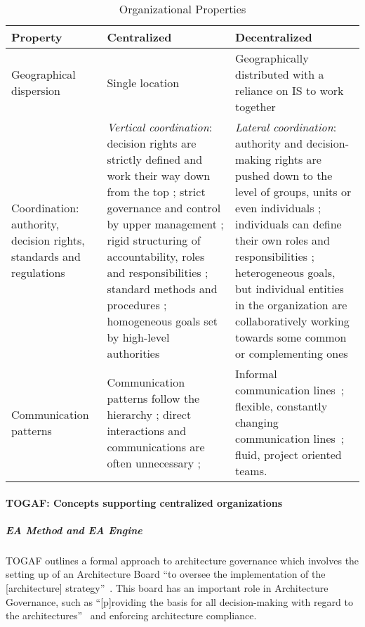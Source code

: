 \begin{table}
\caption{Organizational Properties}
\label{table:org_characteristics}
\begin{tabular}{ | p{} | p{}| p{} |}
%
\hline
%
\textbf{Property} & 
\textbf{Centralized} &
\textbf{Decentralized}  \\
%
\hline
%
Geographical dispersion \cite{luthans2006} & 
Single location &
Geographically distributed with a reliance on IS to work together \cite{applegate1988} \\
%
\hline
%
Coordination: authority, decision rights, standards and regulations & 
\textit{Vertical coordination}: decision rights are strictly defined and work their way down from the top \cite{Weill2004,pearlson2009}; strict governance and control by upper management \cite{pearlson2009,applegate1988}; rigid structuring of accountability, roles and responsibilities \cite{applegate1988}; standard methods and procedures \cite{mintzberg1981}; homogeneous goals set by high-level authorities \cite{Bolman2008} &
\textit{Lateral coordination}: authority and decision-making rights are pushed down to the level of groups, units or even individuals \cite{Weill2004,pearlson2009,robbins1997,Camarinha-Matos2005}; individuals can define their own roles and responsibilities \cite{valveHandbook}; heterogeneous goals, but individual entities in the organization are collaboratively working towards some common or complementing ones~\cite{Camarinha-Matos2005} \\
%
\hline
%
Communication patterns  & 
Communication patterns follow the hierarchy \cite{pearlson2009,applegate1988}; direct interactions and communications are often unnecessary \cite{thompson1967}; &
Informal communication lines~\cite{pearlson2009}; flexible, constantly changing communication lines~\cite{ahuja1998network}; fluid, project oriented teams.~\cite{applegate1988} \\
%
\hline
%
\end{tabular}
\end{table}



\paragraph*{TOGAF: Concepts supporting centralized organizations}

\subparagraph*{EA Method and EA Engine}
TOGAF outlines a formal approach to architecture governance which involves the setting up of an Architecture Board ``to oversee the implementation of the [architecture] strategy''~\cite[Ch. 47]{togaf9.1}. This board has an important role in Architecture Governance, such as ``[p]roviding the basis for all decision-making with regard to the architectures''~\cite[Ch. 47]{togaf9.1} and enforcing architecture compliance. 

